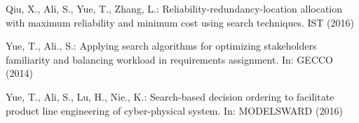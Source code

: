\documentclass{llncs}
\begin{document}
\begin{thebibliography}{10}
Qiu, X., Ali, S., Yue, T., Zhang, L.: Reliability-redundancy-location
	allocation with maximum reliability and minimum cost using search techniques.
	IST  (2016)

Yue, T., Ali., S.: Applying search algorithms for optimizing stakeholders
	familiarity and balancing workload in requirements assignment. In: GECCO
	(2014)

Yue, T., Ali, S., Lu, H., Nie., K.: Search-based decision ordering to
	facilitate product line engineering of cyber-physical system. In: MODELSWARD
	(2016)

\end{thebibliography}
\end{document}
